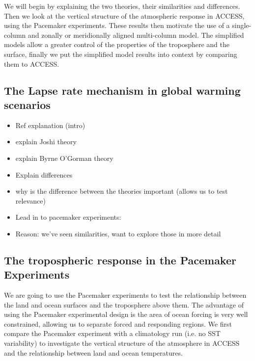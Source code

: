We will begin by explaining the two theories, their similarities and 
differences. Then we look at the vertical structure of the atmospheric response 
in ACCESS, using the Pacemaker experiments. These results then motivate the use 
of a single-column and zonally or meridionally aligned multi-column model. The 
simplified models allow a greater control of the properties of the troposphere 
and the surface, finally we put the simplified model results into context by 
comparing them to ACCESS.

\subsection{The Lapse rate mechanism in global warming scenarios}

\begin{itemize}
	\item Ref explanation (intro)
	\item explain Joshi theory
	\item explain Byrne O'Gorman theory
	\item Explain differences
	\item why is the difference between the theories important (allows us to 
		test relevance)
	\item Lead in to pacemaker experiments:
	\item Reason: we've seen similarities, want to explore those in more detail
\end{itemize}


\subsection{The tropospheric response in the Pacemaker Experiments}

We are going to use the Pacemaker experiments to test the relationship between 
the land and ocean surfaces and the troposphere above them. The advantage of 
using the Pacemaker experimental design is the area of ocean forcing is very 
well constrained, allowing us to separate forced and responding regions.  We 
first compare the Pacemaker experiment with a climatology run (i.e. no SST 
variability) to investigate the vertical structure of the atmosphere in ACCESS 
and the relationship between land and ocean temperatures.

